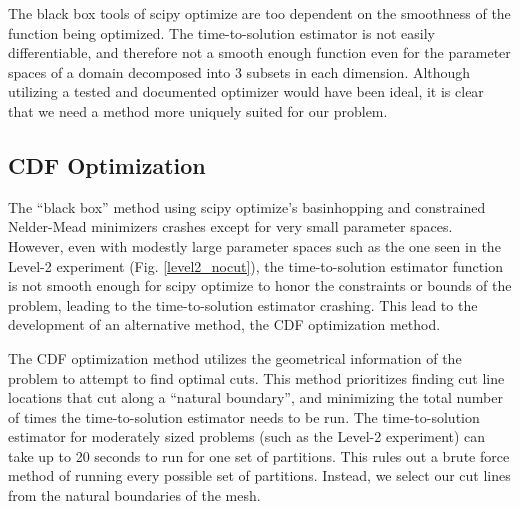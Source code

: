 \documentclass[times,final]{elsarticle}
\begin{document}
The black box tools of scipy optimize are too dependent on the smoothness of the function being optimized.
The time-to-solution estimator is not easily differentiable, and therefore not a smooth enough function even for the parameter spaces of a domain decomposed into 3 subsets in each dimension.
Although utilizing a tested and documented optimizer would have been ideal, it is clear that we need a method more uniquely suited for our problem.

\subsection{CDF Optimization}

The ``black box'' method using scipy optimize's basinhopping and constrained Nelder-Mead minimizers crashes except for very small parameter spaces.
However, even with modestly large parameter spaces such as the one seen in the Level-2 experiment (Fig. \ref{level2_nocut}), the time-to-solution estimator function is not smooth enough for scipy optimize to honor the constraints or bounds of the problem, leading to the time-to-solution estimator crashing.
This lead to the development of an alternative method, the CDF optimization method.

The CDF optimization method utilizes the geometrical information of the problem to attempt to find optimal cuts. This method prioritizes finding cut line locations that cut along a ``natural boundary'', and minimizing the total number of times the time-to-solution estimator needs to be run.
The time-to-solution estimator for moderately sized problems (such as the Level-2 experiment) can take up to 20 seconds to run for one set of partitions.
This rules out a brute force method of running every possible set of partitions.
Instead, we select our cut lines from the natural boundaries of the mesh.
\end{document}

